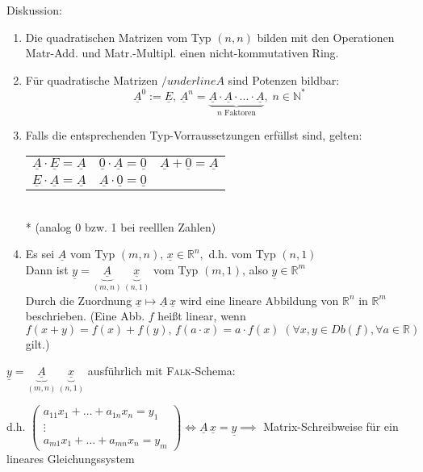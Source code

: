 \documentclass[a4paper]{scrartcl}
\begin{document}
Diskussion:
\begin{enumerate}
\item Die quadratischen Matrizen vom Typ $(n,n)$ bilden mit den Operationen Matr-Add. und Matr.-Multipl. einen nicht-kommutativen Ring.
\item Für quadratische Matrizen $/underline{A}$ sind Potenzen bildbar:
\[ \underline{A}^0 := \underline{E},\, \underline{A}^n = \underbrace{\underline{A} \cdot \underline{A} \cdot ... \cdot \underline{A}}_{n \text{ Faktoren}}, \; n \in \mathbb{N}^*\]
\item Falls die entsprechenden Typ-Vorraussetzungen erfüllst sind, gelten:\\
\begin{tabular}{c|c|c}
$\underline{A} \cdot \underline{E} = \underline{A}$ & $\underline{0} \cdot \underline{A} = \underline{0}$ & $\underline{A} + \underline{0} = \underline{A}$\\
$\underline{E} \cdot \underline{A} = \underline{A}$ & $ \underline{A} \cdot \underline{0} = \underline{0}$ & \\
\end{tabular}\\*
(analog 0 bzw. 1 bei reelllen Zahlen)
\item Es sei $\underline{A}$ vom Typ $(m,n),\, \underline{x} \in \mathbb{R}^n,$ d.h. vom Typ $(n,1)$\\
Dann ist $\underline{y}=\underbrace{\underline{A}}_{(m,n)}\, \underbrace{\underline{x}}_{(n,1)}$ vom Typ $(m,1)$, also $\underline{y} \in \mathbb{R}^m$\\
Durch die Zuordnung $\underline{x} \mapsto \underline{A} \, \underline{x}$ wird eine lineare Abbildung von $\mathbb{R}^n \text{ in } \mathbb{R}^m$ beschrieben. (Eine Abb. $f$ heißt linear, wenn $f(x+y) = f(x) + f(y), \, f(a\cdot x) = a \cdot f(x) \; (\forall x,y \in Db(f), \forall a \in \mathbb{R})$ gilt.)
\end{enumerate}

$\underline{y}=\underbrace{\underline{A}}_{(m,n)}\, \underbrace{\underline{x}}_{(n,1)}$ ausführlich mit \textsc{Falk}-Schema: %

d.h. $\begin{pmatrix}
a_{11} x_1 + \dots + a_{1n} x_n = y_1\\
\vdots \\
a_{m1} x_1 + \dots + a_{mn} x_n = y_m
\end{pmatrix} \Leftrightarrow \underline{A}\, \underline{x} = \underline{y} \implies$ Matrix-Schreibweise für ein lineares Gleichungssystem
\end{document}
